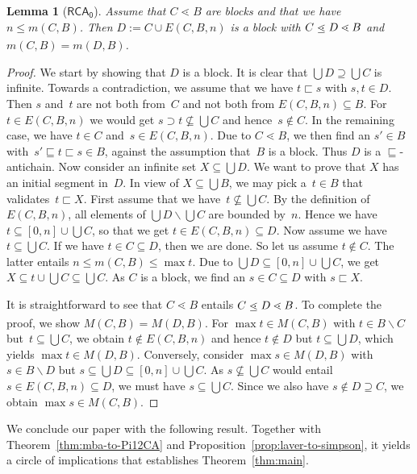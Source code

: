 \documentclass{amsart}
\numberwithin{theorem}{section}
\newtheorem{lemma}[theorem]{Lemma}
\theoremstyle{definition}
\newcommand\ledot{\mathrel{\ensurestackMath{%
  \stackengine{-.5ex}{\lessdot}{-}{U}{c}{F}{F}{S}}}}
\newcommand{\base}[1]{\textstyle\bigcup #1}
\newcommand{\barrsucc}[2]{#1 \ledot #2}
\newcommand{\barrpropsucc}[2]{#1 \lessdot #2}
\newcommand{\extbarr}[3]{E(#1,#2,#3)}
\newcommand{\minbarr}[2]{m(#1,#2)}
\begin{document}
\begin{lemma}[$\mathsf{RCA_0}$]
    Assume that $C\lessdot B$ are blocks and that we have $n\leq \minbarr{C}{B}$. Then $D:=C\cup \extbarr{C}{B}{n}$ is a block with $\barrpropsucc{\barrsucc{C}{D}}{B}$ and $\minbarr{C}{B}=\minbarr{D}{B}$.
\end{lemma}
\begin{proof}
    We start by showing that $D$ is a block. It is clear that $\bigcup D\supseteq\bigcup C$ is infinite. Towards a contradiction, we assume that we have $t\sqsubset s$ with $s,t\in D$. Then $s$ and~$t$ are not both from~$C$ and not both from $\extbarr{C}{B}{n}\subseteq B$. For $t\in E(C,B,n)$ we would get $s\supset t\not\subseteq\bigcup C$ and hence~$s\notin C$. In the remaining case, we have $t\in C$ and~$s\in \extbarr{C}{B}{n}$. Due to $\barrpropsucc{C}{B}$, we then find an $s'\in B$ with~$s'\sqsubseteq t\sqsubset s\in B$, against the assumption that~$B$ is a block. Thus $D$ is a $\sqsubseteq$-antichain. Now consider an infinite set $X\subseteq\bigcup D$. We want to prove that $X$ has an initial segment in~$D$. In view of $X\subseteq\base{B}$, we may pick a~$t\in B$ that validates~$t\sqsubset X$. First assume that we have~$t\not\subseteq\bigcup C$. By the definition of $E(C,B,n)$, all elements of $\bigcup D\backslash\bigcup C$ are bounded by~$n$. Hence we have $t\subseteq [0,n]\cup\bigcup C$, so that we get $t\in E(C,B,n)\subseteq D$. Now assume we have $t\subseteq\bigcup C$. If we have $t\in C\subseteq D$, then we are done. So let us assume $t\notin C$. The latter entails $n\leq m(C,B)\leq\max t$. Due to $\bigcup D\subseteq[0,n]\cup\bigcup C$, we get $X\subseteq t\cup\bigcup C\subseteq\bigcup C$. As $C$ is a block, we find an $s\in C\subseteq D$ with $s\sqsubset X$.

    It is straightforward to see that $C\lessdot B$ entails $C\ledot D\lessdot B$. To complete the proof, we show $M(C,B)=M(D,B)$. For $\max t\in M(C,B)$ with $t\in B\backslash C$ but~$t\subseteq\bigcup C$, we obtain $t\notin E(C,B,n)$ and hence $t\notin D$ but $t\subseteq\bigcup D$, which yields $\max t\in M(D,B)$. Conversely, consider $\max s\in M(D,B)$ with $s\in B\backslash D$ but $s\subseteq\bigcup D\subseteq[0,n]\cup\bigcup C$. As $s\not\subseteq\bigcup C$ would entail $s\in E(C,B,n)\subseteq D$, we must have $s\subseteq\bigcup C$. Since we also have $s\not\in D\supseteq C$, we obtain $\max s\in M(C,B)$.
\end{proof}

We conclude our paper with the following result. Together with Theorem~\ref{thm:mba-to-Pi12CA} and Proposition~\ref{prop:laver-to-simpson}, it yields a circle of implications that establishes Theorem~\ref{thm:main}.
\end{document}

